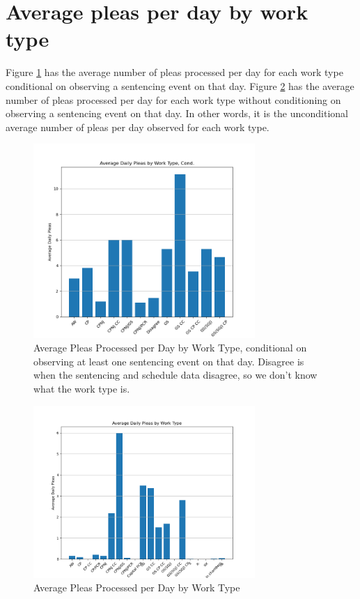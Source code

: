 \documentclass[11pt]{article}
\begin{document}
\section{Average pleas per day by work type}
  Figure \ref{fig-avg-plea-cond} has the average number of pleas processed per day for each work type conditional on observing
  a sentencing event on that day. Figure \ref{fig-avg-plea} has the average number of pleas processed per day for each work
  type without conditioning on observing a sentencing event on that day. In other words, it is the unconditional average number of pleas per day
  observed for each work type.
  \begin{figure}[H]
    \centering
    \includegraphics[width=0.75\textwidth]{../../../output/figures/Exploration/avg_pleas_by_worktype_cond.png}
    \caption{Average Pleas Processed per Day by Work Type, conditional on observing at least one sentencing event on that day. Disagree is when the sentencing and schedule data disagree, so we don't know what the work type is.}
    \label{fig-avg-plea-cond}
  \end{figure}

  \begin{figure}[H]
    \centering
    \includegraphics[width=0.75\textwidth]{../../../output/figures/Exploration/avg_pleas_by_worktype.png}
    \caption{Average Pleas Processed per Day by Work Type}
    \label{fig-avg-plea}
  \end{figure}
\end{document}
